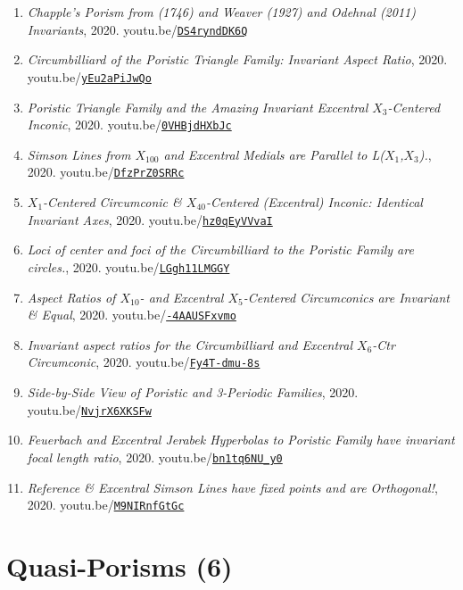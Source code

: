 \documentclass[12pt]{article}
\begin{document}
\begin{enumerate}[resume]
\item \textit{Chapple's Porism from (1746) and Weaver (1927) and Odehnal (2011) Invariants}, 2020. youtu.be/\href{https://youtu.be/DS4ryndDK6Q}{\nolinkurl{DS4ryndDK6Q}}
\item \textit{Circumbilliard of the Poristic Triangle Family: Invariant Aspect Ratio}, 2020. youtu.be/\href{https://youtu.be/yEu2aPiJwQo}{\nolinkurl{yEu2aPiJwQo}}
\item \textit{Poristic Triangle Family and the Amazing Invariant Excentral $X_{3}$-Centered Inconic}, 2020. youtu.be/\href{https://youtu.be/0VHBjdHXbJc}{\nolinkurl{0VHBjdHXbJc}}
\item \textit{Simson Lines from $X_{100}$ and Excentral Medials are Parallel to L($X_{1}$,$X_{3}$).}, 2020. youtu.be/\href{https://youtu.be/DfzPrZ0SRRc}{\nolinkurl{DfzPrZ0SRRc}}
\item \textit{$X_{1}$-Centered Circumconic \& $X_{40}$-Centered (Excentral) Inconic: Identical Invariant Axes}, 2020. youtu.be/\href{https://youtu.be/hz0qEyVVvaI}{\nolinkurl{hz0qEyVVvaI}}
\item \textit{Loci of center and foci of the Circumbilliard to the Poristic Family are circles.}, 2020. youtu.be/\href{https://youtu.be/LGgh11LMGGY}{\nolinkurl{LGgh11LMGGY}}
\item \textit{Aspect Ratios of $X_{10}$- and Excentral $X_{5}$-Centered Circumconics are Invariant \& Equal}, 2020. youtu.be/\href{https://youtu.be/-4AAUSFxvmo}{\nolinkurl{-4AAUSFxvmo}}
\item \textit{Invariant aspect ratios for the Circumbilliard and Excentral $X_{6}$-Ctr Circumconic}, 2020. youtu.be/\href{https://youtu.be/Fy4T-dmu-8s}{\nolinkurl{Fy4T-dmu-8s}}
\item \textit{Side-by-Side View of Poristic and 3-Periodic Families}, 2020. youtu.be/\href{https://youtu.be/NvjrX6XKSFw}{\nolinkurl{NvjrX6XKSFw}}
\item \textit{Feuerbach and Excentral Jerabek Hyperbolas to Poristic Family have invariant focal length ratio}, 2020. youtu.be/\href{https://youtu.be/bn1tq6NU_y0}{\nolinkurl{bn1tq6NU\_y0}}
\item \textit{Reference \& Excentral Simson Lines have fixed points and are Orthogonal!}, 2020. youtu.be/\href{https://youtu.be/M9NIRnfGtGc}{\nolinkurl{M9NIRnfGtGc}}
\end{enumerate}

\section{Quasi-Porisms (6)}
\end{document}
